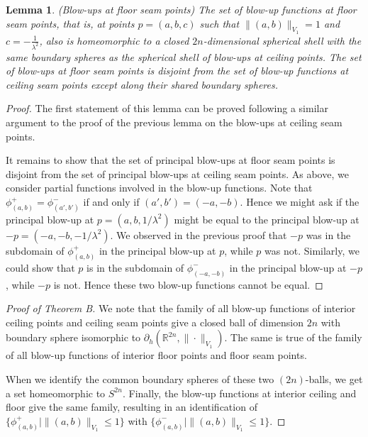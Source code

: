 \documentclass{article}
\newtheorem{lemma}[theorem]{Lemma}
\theoremstyle{definition}
\newcommand{\norm}[1]{\|#1\|}
\newcommand{\bhor}{\partial_h}
\newcommand{\R}{{\mathbb R}}
\begin{document}
\begin{lemma}{(Blow-ups at floor seam points)}
The set of blow-up functions at floor seam points, that is, at points $p = (a,b,c)$ such that $\norm{(a,b)}_{V_1} = 1$ and $c = -\frac1{\lambda^2}$, also is homeomorphic to a closed $2n$-dimensional spherical shell with the same boundary spheres as the spherical shell of blow-ups at ceiling points. The set of blow-ups at floor seam points is disjoint from the set of blow-up functions at ceiling seam points except along their shared boundary spheres.
\end{lemma}

\begin{proof}
The first statement of this lemma can be proved following a similar argument to the proof of the previous lemma on the blow-ups at ceiling seam points.

It remains to show that the set of principal blow-ups at floor seam points is disjoint from the set of principal blow-ups at ceiling seam points. As above, we consider partial functions involved in the blow-up functions. Note that $\phi^+_{(a,b)} = \phi^-_{(a',b')}$ if and only if $(a', b') = (-a, -b)$. Hence we might ask if the principal blow-up at $p = (a,b, 1/\lambda^2)$ might be equal to the principal blow-up at $-p = (-a, -b, -1/\lambda^2)$. We observed in the previous proof that $-p$ was in the subdomain of $\phi^+_{(a,b)}$ in the principal blow-up at $p$, while $p$ was not. Similarly, we could show that $p$ is in the subdomain of $\phi^-_{(-a,-b)}$ in the principal blow-up at $-p$, while $-p$ is not. Hence these two blow-up functions cannot be equal.
\end{proof}



\begin{proof}[Proof of Theorem B] 
We note that the family of all blow-up functions of interior ceiling points and ceiling seam points give a closed ball of dimension $2n$ with boundary sphere isomorphic to $\bhor(\R^{2n},\norm{\cdot}_{V_1})$. The same is true of the family of all blow-up functions of interior floor points and floor seam points.

When we identify the common boundary spheres of these two $(2n)$-balls, we get a set homeomorphic to $S^{2n}$. Finally, the blow-up functions at interior ceiling and floor give the same family, resulting in an identification of $\{\phi^+_{(a,b)} \mid \norm{(a,b)}_{V_1} \leq 1\}$ with $\{\phi^-_{(a,b)} \mid \norm{(a,b)}_{V_1} \leq 1\}$.
\end{proof}
\end{document}

